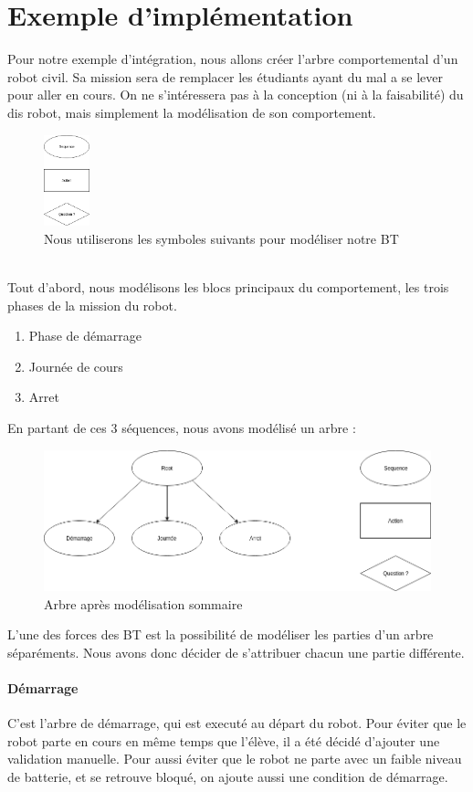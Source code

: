 \documentclass[titlepage]{article}
\begin{document}
	\section{Exemple d'implémentation}
	Pour notre exemple d'intégration, nous allons créer l'arbre comportemental d'un robot civil. Sa mission sera de remplacer les étudiants ayant du mal a se lever pour aller en cours. On ne s'intéressera pas à la conception (ni à la faisabilité) du dis robot, mais simplement la modélisation de son comportement. 
	\\
	\begin{figure}[h!]
		\centering
		\includegraphics[width=50px]{img/BT_1.png}
		\caption{Nous utiliserons les symboles suivants pour modéliser notre BT}
		\label{fig:exemple_1}
	\end{figure}
	\\
	Tout d'abord, nous modélisons les blocs principaux du comportement, les trois phases de la mission du robot.
	\begin{enumerate}
		\item Phase de démarrage
		\item Journée de cours
		\item Arret
	\end{enumerate}
	En partant de ces 3 séquences, nous avons modélisé un arbre :
	\begin{figure}[h!]
		\centering
		\includegraphics[width=\linewidth]{img/BT_2.png}
		\caption{Arbre après modélisation sommaire}
		\label{fig:exemple_2}
	\end{figure}
	L'une des forces des BT est la possibilité de modéliser les parties d'un arbre séparéments. Nous avons donc décider de s'attribuer chacun une partie différente.
	\\
	\paragraph{Démarrage}
	C'est l'arbre de démarrage, qui est executé au départ du robot. Pour éviter que le robot parte en cours en même temps que l'élève, il a été décidé d'ajouter une validation manuelle. Pour aussi éviter que le robot ne parte avec un faible niveau de batterie, et se retrouve bloqué, on ajoute aussi une condition de démarrage.
\end{document}
